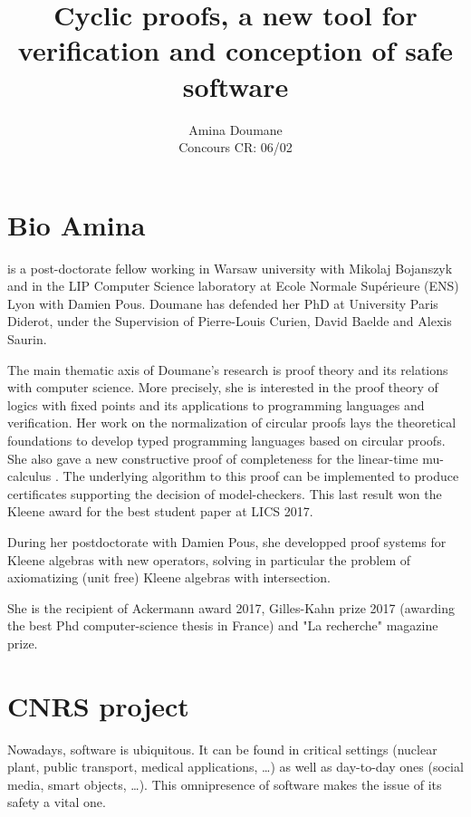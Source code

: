 \documentclass{article}
\title{\textbf{
Cyclic proofs, a new tool for verification and conception of safe software
} }
\author{
  Amina Doumane\\
  Concours CR: 06/02
}
\begin{document}
\maketitle

\section*{Bio Amina}

  is a post-doctorate fellow working in Warsaw university with Mikolaj Bojanszyk and in the
LIP Computer Science laboratory at Ecole Normale
Supérieure (ENS) Lyon with Damien Pous.
Doumane has defended her PhD at University Paris Diderot,
under the Supervision of Pierre-Louis Curien, David
Baelde and Alexis Saurin.


The main thematic axis of Doumane's research is proof theory and its relations with computer science. More precisely, she is interested in the proof theory of logics with fixed points and its applications to programming languages and verification. Her work on the normalization of circular proofs \cite{baelde16csl} lays the theoretical foundations to develop typed programming languages based on circular proofs. She also gave a new constructive proof of completeness for the linear-time mu-calculus \cite{doumane16lics, doumane17lics}. The underlying  algorithm to this proof can be implemented to produce certificates supporting the decision of model-checkers. This last result won the Kleene award for the best student paper at LICS 2017. 

During her postdoctorate with Damien Pous, she developped proof systems for Kleene algebras with new operators, solving in particular the problem of axiomatizing (unit free) Kleene algebras with intersection.

She is the recipient of Ackermann award 2017, Gilles-Kahn prize 2017 (awarding the best Phd computer-science thesis  in France) and "La recherche" magazine prize. 

\section*{CNRS project}
Nowadays, software is ubiquitous. It can be found in critical settings (nuclear plant,
public transport, medical applications, \dots) as well as day-to-day ones (social media, smart objects, \dots).  This omnipresence of software makes the issue of its safety a vital one.
\end{document}
